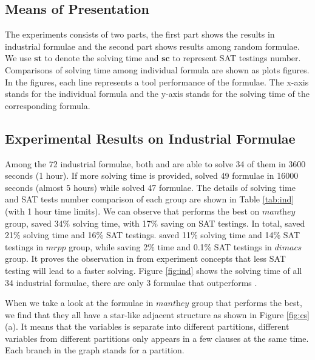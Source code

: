 \subsection{Means of Presentation}
The experiments consists of two parts, the first part shows the results in industrial formulae and the second part shows results among random formulae.
We use $\textbf{st}$ to denote the solving time and $\textbf{sc}$ to represent SAT testings number.
Comparisons of solving time among individual formula are shown as plots figures. In the figures, each line represents a tool performance of the formulae. The x-axis stands for the individual formula and the y-axis stands for the solving time of the corresponding formula.

\subsection{Experimental Results on Industrial Formulae}\label{sec:ind_expr}
Among the 72 industrial formulae, both \tool and \minibones are able to solve 34 of them in 3600 seconds (1 hour).
If more solving time is provided, \tool solved 49 formulae in 16000 seconds (almost 5 hours) while \minibones solved 47 formulae.
The details of solving time and SAT tests number comparison of each group are shown in Table \ref{tab:ind} (with 1 hour time limits). We can observe that \tool performs the best on $\textit{manthey}$ group, saved 34\% solving time, with 17\% saving on SAT testings. In total, \tool saved 21\% solving time and 16\% SAT testings. \tool saved 11\% solving time and 14\% SAT testings in $\textit{mrpp}$ group, while saving 2\% time and 0.1\% SAT testings in $\textit{dimacs}$ group. It proves the observation in \cite{JLM15} from experiment concepts that less SAT testing will lead to a faster solving.
Figure \ref{fig:ind} shows the solving time of all 34 industrial formulae, there are only 3 formulae that \minibones outperforms \tool.

When we take a look at the formulae in $\textit{manthey}$ group that \tool performs the best, we find that they all have a star-like adjacent structure as shown in Figure \ref{fig:cs}(a). It means that the variables is separate into different partitions, different variables from different partitions only appears in a few clauses at the same time. Each branch in the graph stands for a partition.


